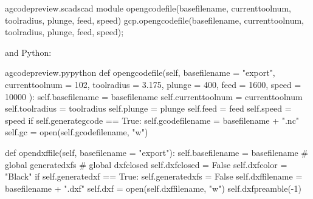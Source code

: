 \documentclass{ltxdoc}
\begin{document}
 
\lstset{firstnumber=\thegcpscad}
\begin{writecode}{a}{gcodepreview.scad}{scad}
module opengcodefile(basefilename, currenttoolnum, toolradius, plunge, feed, speed) {
    gcp.opengcodefile(basefilename, currenttoolnum, toolradius, plunge, feed, speed);
}

\end{writecode}
\addtocounter{gcpscad}{4}

\noindent and Python:

\lstset{firstnumber=\thegcpy}
\begin{writecode}{a}{gcodepreview.py}{python}
    def opengcodefile(self, basefilename = "export", 
                      currenttoolnum = 102, 
                      toolradius = 3.175, 
                      plunge = 400, 
                      feed = 1600, 
                      speed = 10000
                      ):
        self.basefilename = basefilename
        self.currenttoolnum = currenttoolnum
        self.toolradius = toolradius
        self.plunge = plunge
        self.feed = feed
        self.speed = speed
        if self.generategcode == True:
            self.gcodefilename = basefilename + ".nc"
            self.gc = open(self.gcodefilename, "w")

    def opendxffile(self, basefilename = "export"): 
        self.basefilename = basefilename
#        global generatedxfs
#        global dxfclosed
        self.dxfclosed = False
        self.dxfcolor = "Black"
        if self.generatedxf == True:
            self.generatedxfs = False
            self.dxffilename = basefilename + ".dxf"
            self.dxf = open(self.dxffilename, "w")
            self.dxfpreamble(-1)


\end{writecode}
\end{document}
